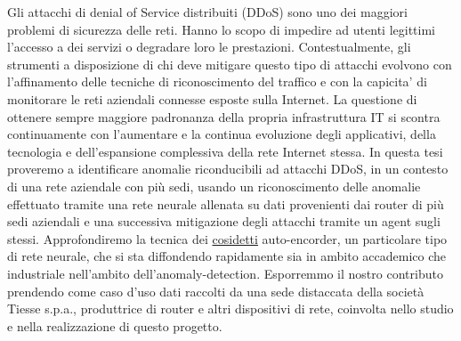 


\italiano
\sommario

Gli attacchi di denial of Service distribuiti (DDoS) sono uno dei maggiori problemi di sicurezza delle reti. Hanno lo scopo di impedire ad utenti legittimi l'accesso a dei servizi o degradare loro le prestazioni. Contestualmente, gli strumenti a disposizione di chi deve mitigare questo tipo di attacchi evolvono con l'affinamento delle tecniche di riconoscimento del traffico e con la capicita' di monitorare le reti aziendali connesse esposte sulla Internet. La questione di ottenere sempre maggiore padronanza della propria infrastruttura IT si scontra continuamente con l'aumentare e la continua evoluzione degli applicativi, della tecnologia e dell'espansione complessiva della rete Internet stessa. In questa tesi proveremo a identificare anomalie riconducibili ad attacchi DDoS, in un contesto di una rete aziendale con più sedi, usando un riconoscimento delle anomalie effettuato tramite  una rete neurale allenata su dati provenienti dai router di più sedi aziendali e una successiva mitigazione degli attacchi tramite un agent sugli stessi. Approfondiremo la tecnica dei \uline{cosidetti} auto-encorder, un particolare tipo di rete neurale, che si sta diffondendo rapidamente sia in ambito accademico che industriale nell'ambito dell'anomaly-detection. Esporremmo il nostro contributo prendendo come caso d'uso dati raccolti da una sede distaccata della società Tiesse s.p.a., produttrice di router e altri dispositivi di rete, coinvolta nello studio e nella realizzazione di questo progetto.
